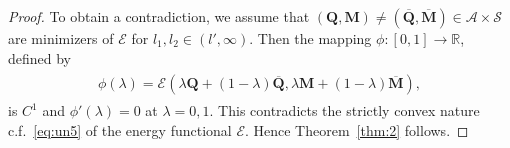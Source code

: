\documentclass{article}
\def\Qvec{\mathbf{Q}}
\def \Mvec{\mathbf{M}}
\begin{document}
\begin{proof}
To obtain a contradiction, we assume that $\left(\Qvec, \Mvec\right)\ne \left(\overline{\Qvec}, \overline{\Mvec}\right)\in\mathcal{A}\times\mathcal{S}$ are minimizers of $\mathcal{E}$ for $l_1,l_2\in\left(l', \infty\right)$. Then the mapping $\phi:[0,1]\rightarrow\mathbb R$, defined by
\begin{eqnarray}
\begin{aligned}
\phi\left(\lambda\right)=\mathcal{E}\left(\lambda\Qvec+\left(1-\lambda\right)\overline{\Qvec}, \lambda\Mvec + \left(1-\lambda\right)\overline{\Mvec}\right),
\end{aligned}
\end{eqnarray}
is $C^1$ and $\phi'\left(\lambda\right)=0$ at $\lambda=0,1$. This contradicts the strictly convex nature c.f.\ \eqref{eq:un5} of the energy functional $\mathcal{E}$. Hence Theorem~\ref{thm:2} follows.
\end{proof}
\end{document}
